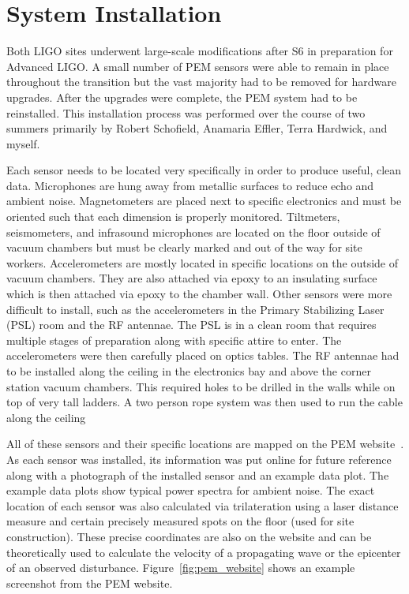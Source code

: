 \section{System Installation}

Both LIGO sites underwent large-scale modifications after S6 in preparation for Advanced LIGO. A small number of PEM sensors were able to remain in place throughout the transition but the vast majority had to be removed for hardware upgrades. After the upgrades were complete, the PEM system had to be reinstalled. This installation process was performed over the course of two summers primarily by Robert Schofield, Anamaria Effler, Terra Hardwick, and myself.

Each sensor needs to be located very specifically in order to produce useful, clean data. Microphones are hung away from metallic surfaces to reduce echo and ambient noise. Magnetometers are placed next to specific electronics and must be oriented such that each dimension is properly monitored. Tiltmeters, seismometers, and infrasound microphones are located on the floor outside of vacuum chambers but must be clearly marked and out of the way for site workers. Accelerometers are mostly located in specific locations on the outside of vacuum chambers. They are also attached via epoxy to an insulating surface which is then attached via epoxy to the chamber wall. Other sensors were more difficult to install, such as the accelerometers in the Primary Stabilizing Laser (PSL) room and the RF antennae. The PSL is in a clean room that requires multiple stages of preparation along with specific attire to enter. The accelerometers were then carefully placed on optics tables. The RF antennae had to be installed along the ceiling in the electronics bay and above the corner station vacuum chambers. This required holes to be drilled in the walls while on top of very tall ladders. A two person rope system was then used to run the cable along the ceiling 

All of these sensors and their specific locations are mapped on the PEM website~\cite{pem_website}. As each sensor was installed, its information was put online for future reference along with a photograph of the installed sensor and an example data plot. The example data plots show typical power spectra for ambient noise. The exact location of each sensor was also calculated via trilateration using a laser distance measure and certain precisely measured spots on the floor (used for site construction). These precise coordinates are also on the website and can be theoretically used to calculate the velocity of a propagating wave or the epicenter of an observed disturbance. Figure~\ref{fig:pem_website} shows an example screenshot from the PEM website.

